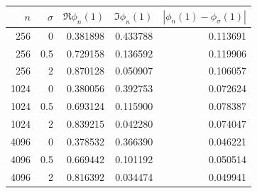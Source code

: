 \begin{tabular}{@{}rrrrr@{}}
\toprule
$n$ & $\sigma$ & $\Re\phi_n(1)$ & $\Im\phi_n(1)$ & $|\phi_n(1)-\phi_\sigma(1)|$ \\
\midrule
256 & 0 & 0.381898 & 0.433788 & 0.113691 \\
256 & 0.5 & 0.729158 & 0.136592 & 0.119906 \\
256 & 2 & 0.870128 & 0.050907 & 0.106057 \\
1024 & 0 & 0.380056 & 0.392753 & 0.072624 \\
1024 & 0.5 & 0.693124 & 0.115900 & 0.078387 \\
1024 & 2 & 0.839215 & 0.042280 & 0.074047 \\
4096 & 0 & 0.378532 & 0.366390 & 0.046221 \\
4096 & 0.5 & 0.669442 & 0.101192 & 0.050514 \\
4096 & 2 & 0.816392 & 0.034474 & 0.049941 \\
\bottomrule
\end{tabular}
